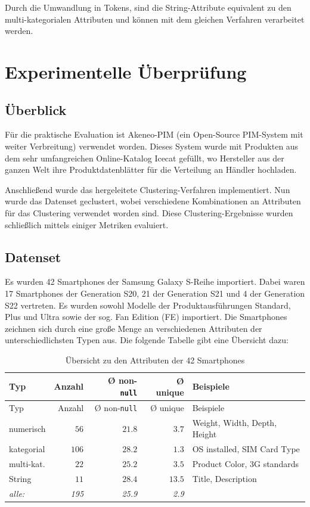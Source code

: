 Durch die Umwandlung in Tokens, sind die String-Attribute equivalent zu
den multi-kategorialen Attributen und können mit dem gleichen Verfahren
verarbeitet werden.

\hypertarget{experimentelle-uxfcberpruxfcfung}{%
\section{Experimentelle
Überprüfung}\label{experimentelle-uxfcberpruxfcfung}}

\hypertarget{uxfcberblick}{%
\subsection{Überblick}\label{uxfcberblick}}

Für die praktische Evaluation ist Akeneo-PIM \autocite{akeneo2022about}
(ein Open-Source PIM-System mit weiter Verbreitung) verwendet worden.
Dieses System wurde mit Produkten aus dem sehr umfangreichen
Online-Katalog Icecat \autocite{icecat2021} gefüllt, wo Hersteller aus
der ganzen Welt ihre Produktdatenblätter für die Verteilung an Händler
hochladen.

Anschließend wurde das hergeleitete Clustering-Verfahren implementiert.
Nun wurde das Datenset geclustert, wobei verschiedene Kombinationen an
Attributen für das Clustering verwendet worden sind. Diese
Clustering-Ergebnisse wurden schließlich mittels einiger Metriken
evaluiert.

\hypertarget{datenset}{%
\subsection{Datenset}\label{datenset}}

Es wurden 42 Smartphones der Samsung Galaxy S-Reihe importiert. Dabei
waren 17 Smartphones der Generation S20, 21 der Generation S21 und 4 der
Generation S22 vertreten. Es wurden sowohl Modelle der
Produktausführungen Standard, Plus und Ultra sowie der sog. Fan Edition
(FE) importiert. Die Smartphones zeichnen sich durch eine große Menge an
verschiedenen Attributen der unterschiedlichsten Typen aus. Die folgende
Tabelle gibt eine Übersicht dazu:

\begin{longtable}[]{@{}lrrrl@{}}
\caption{Übersicht zu den Attributen der 42 Smartphones}\tabularnewline
\toprule()
Typ & Anzahl & Ø non-\texttt{null} & Ø unique & Beispiele \\
\midrule()
\endfirsthead
\toprule()
Typ & Anzahl & Ø non-\texttt{null} & Ø unique & Beispiele \\
\midrule()
\endhead
numerisch & \(56\) & \(21.8\) & \(3.7\) & Weight, Width, Depth,
Height \\
kategorial & \(106\) & \(28.2\) & \(1.3\) & OS installed, SIM Card
Type \\
multi-kat. & \(22\) & \(25.2\) & \(3.5\) & Product Color, 3G
standards \\
String & \(11\) & \(28.4\) & \(13.5\) & Title, Description \\
\emph{alle:} & \emph{195} & \emph{25.9} & \emph{2.9} & \\
\bottomrule()
\end{longtable}

